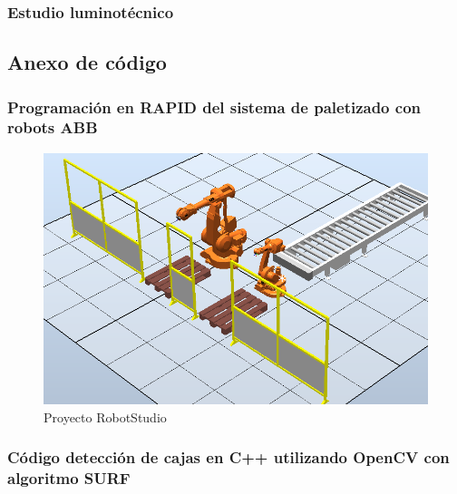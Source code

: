 \pagebreak

\subsubsection{Estudio luminotécnico}











\newpage
\subsection{Anexo de código}

\pagebreak

\subsubsection{Programación en RAPID del sistema de paletizado con robots ABB}

\begin{figure}[!htb]
\centering
\includegraphics[width=1\textwidth]{Datasheets/robotstudio.png}
\caption{Proyecto RobotStudio}
\label{fig:digraph}
\end{figure}



\pagebreak

\subsubsection{Código detección de cajas en C++ utilizando OpenCV con algoritmo SURF}

\newpage











